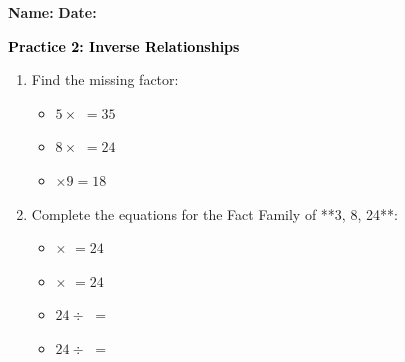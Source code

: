 \documentclass[12pt, letterpaper, fleqn]{article}
\newcommand{\blank}{\underline{\hspace{2.2cm}}}
\begin{document}
\textbf{Name:} \underline{\hspace{5cm}}
\hfill
\textbf{Date:} \underline{\hspace{3cm}}\\

\begin{tcolorbox}[colback=customteal!20]
    \large\textcolor{black}{\textbf{Practice 2: Inverse Relationships}}
\end{tcolorbox}

\vspace{5mm}
\begin{enumerate}[itemsep=2.5cm, leftmargin=0.6cm]
\item Find the missing factor:
\begin{itemize}[itemsep=1cm]
  \item $5 \times$ \blank $= 35$
  \item $8 \times$ \blank $= 24$
  \item \blank $\times 9 = 18$
\end{itemize}

\item Complete the equations for the Fact Family of **3, 8, 24**:
\begin{itemize}[itemsep=0.8cm]
  \item \blank $\times$ \blank $= 24$
  \item \blank $\times$ \blank $= 24$
  \item $24 \div$ \blank $=$ \blank
  \item $24 \div$ \blank $=$ \blank
\end{itemize}
\end{enumerate}
\end{document}
